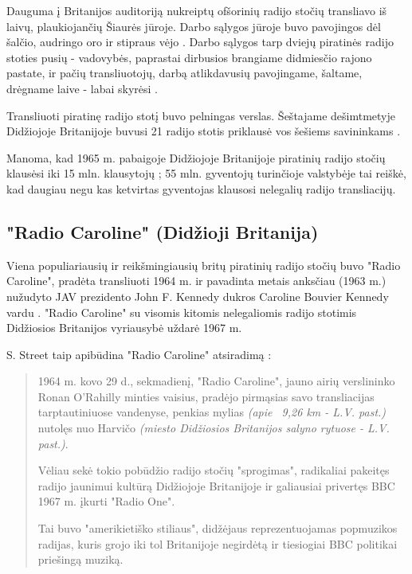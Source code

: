\documentclass[kursinis-darbas]{vukf}
\begin{document}
Dauguma į Britanijos auditoriją nukreiptų ofšorinių radijo stočių transliavo iš laivų, plaukiojančių Šiaurės jūroje. Darbo sąlygos jūroje buvo pavojingos dėl šalčio, audringo oro ir stipraus vėjo \cite[p.~238]{chs_encyclopedia_of_radio}. Darbo sąlygos tarp dviejų piratinės radijo stoties pusių - vadovybės, paprastai dirbusios brangiame didmiesčio rajono pastate, ir pačių transliuotojų, darbą atlikdavusių pavojingame, šaltame, drėgname laive - labai skyrėsi \cite[p.~238]{chs_encyclopedia_of_radio}.

Transliuoti piratinę radijo stotį buvo pelningas verslas. Šeštajame dešimtmetyje Didžiojoje Britanijoje buvusi 21 radijo stotis \cite[p.~139]{hc_key_concepts_in_radio_studies} priklausė vos šešiems savininkams \cite[p.~238]{chs_encyclopedia_of_radio}.

Manoma, kad 1965 m. pabaigoje Didžiojoje Britanijoje piratinių radijo stočių klausėsi iki 15 mln. klausytojų \cite[p.~447]{js_continuum_encyclopedia} \cite{bbc_radio_4_do_pirates_rule_the_air_waves}; 55 mln. gyventojų turinčioje valstybėje \cite{uk_population_1965} tai reiškė, kad daugiau negu kas ketvirtas gyventojas klausosi nelegalių radijo transliacijų.


\subsection{"Radio Caroline" (Didžioji Britanija)}

Viena populiariausių ir reikšmingiausių britų piratinių radijo stočių buvo "Radio Caroline", pradėta transliuoti 1964 m. ir pavadinta metais anksčiau (1963 m.) nužudyto JAV prezidento John F. Kennedy dukros Caroline Bouvier Kennedy vardu \cite[p.~238]{chs_encyclopedia_of_radio}. "Radio Caroline" su visomis kitomis nelegaliomis radijo stotimis Didžiosios Britanijos vyriausybė uždarė 1967 m.

S. Street taip apibūdina "Radio Caroline" atsiradimą \cite[p.~202]{ss_crossing_the_ether_british_public_service_radio_and_commercial_competition}:

\begin{quotation}
	1964 m. kovo 29 d., sekmadienį, "Radio Caroline", jauno airių verslininko Ronan O'Rahilly minties vaisius, pradėjo pirmąsias savo transliacijas tarptautiniuose vandenyse, penkias mylias \emph{(apie ~9,26 km - L.V. past.)} nutolęs nuo Harvičo \emph{(miesto Didžiosios Britanijos salyno rytuose - L.V. past.)}.
	
	Vėliau sekė tokio pobūdžio radijo stočių "sprogimas", radikaliai pakeitęs radijo jaunimui kultūrą Didžiojoje Britanijoje ir galiausiai privertęs \gls{BBC} 1967 m. įkurti "Radio One".
	
	Tai buvo "amerikietiško stiliaus", didžėjaus reprezentuojamas popmuzikos radijas, kuris grojo iki tol Britanijoje negirdėtą ir tiesiogiai \gls{BBC} politikai priešingą muziką.
\end{quotation}
\end{document}
